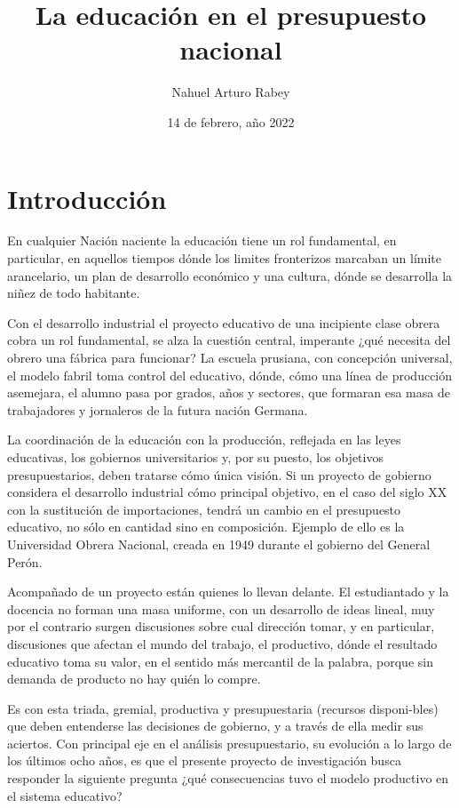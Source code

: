 \documentclass[12pt, a4]{article}
\title{
    La educación en el presupuesto nacional
}
\author{Nahuel Arturo Rabey}
\date{14 de febrero, año 2022}
\begin{document}
\begin{titlepage}
    \maketitle
\end{titlepage}

\tableofcontents

\section{Introducción}
En cualquier Nación naciente la educación tiene un rol fundamental, en particular, en aquellos tiempos dónde los limites fronterizos marcaban un límite arancelario, un plan de desarrollo económico y una cultura, dónde se desarrolla la niñez de todo habitante.

Con el desarrollo industrial el proyecto educativo de una incipiente clase obrera cobra un rol fundamental, se alza la cuestión central, imperante ¿qué necesita del obrero una fábrica para funcionar? La escuela prusiana, con concepción universal, el modelo fabril toma control del educativo, dónde, cómo una línea de producción asemejara, el alumno pasa por grados, años y sectores, que formaran esa masa de trabajadores y jornaleros de la futura nación Germana.

La coordinación de la educación con la producción, reflejada en las leyes educativas, los gobiernos universitarios y, por su puesto, los objetivos presupuestarios, deben tratarse cómo única visión. Si un proyecto de gobierno considera el desarrollo industrial cómo principal objetivo, en el caso del siglo XX con la sustitución de importaciones, tendrá un cambio en el presupuesto educativo, no sólo en cantidad sino en composición. Ejemplo de ello es la Universidad Obrera Nacional, creada en 1949 durante el gobierno del General Perón.

Acompañado de un proyecto están quienes lo llevan delante. El estudiantado y la docencia no forman una masa uniforme, con un desarrollo de ideas lineal, muy por el contrario surgen discusiones sobre cual dirección tomar, y en particular, discusiones que afectan el mundo del trabajo, el productivo, dónde el resultado educativo toma su valor, en el sentido más mercantil de la palabra, porque sin demanda de producto no hay quién lo compre.

Es con esta triada, gremial, productiva y presupuestaria (recursos disponi-bles) que deben entenderse las decisiones de gobierno, y a través de ella medir sus aciertos. Con principal eje en el análisis presupuestario, su evolución a lo largo de los últimos ocho años, es que el presente proyecto de investigación busca responder la siguiente pregunta ¿qué consecuencias tuvo el modelo productivo en el sistema educativo?
\end{document}
